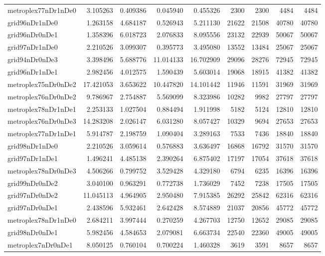 \begin{longtable}{|l|r|r|r|r|r|r|r|r|}
metroplex77nDr1nDe0 & 3.105263 & 0.409386 & 0.045940 & 0.455326 & 2300 & 2300 & 4484 & 4484 \\
grid96nDr1nDe0 & 1.263158 & 4.684187 & 0.526943 & 5.211130 & 21622 & 21508 & 40780 & 40780 \\
grid96nDr0nDe1 & 1.358396 & 6.018723 & 2.076833 & 8.095556 & 23132 & 22939 & 50067 & 50067 \\
grid97nDr1nDe0 & 2.210526 & 3.099307 & 0.395773 & 3.495080 & 13552 & 13484 & 25067 & 25067 \\
grid94nDr0nDe3 & 3.398496 & 5.688776 & 11.014133 & 16.702909 & 29096 & 28276 & 72945 & 72945 \\
grid96nDr1nDe1 & 2.982456 & 4.012575 & 1.590439 & 5.603014 & 19068 & 18915 & 41382 & 41382 \\
metroplex75nDr0nDe2 & 17.421053 & 3.653622 & 10.447820 & 14.101442 & 11946 & 11591 & 31969 & 31969 \\
metroplex76nDr0nDe2 & 9.786967 & 2.754887 & 5.569099 & 8.323986 & 10282 & 9982 & 27797 & 27797 \\
metroplex78nDr1nDe1 & 2.253133 & 1.027504 & 0.884494 & 1.911998 & 5182 & 5124 & 12810 & 12810 \\
metroplex76nDr0nDe3 & 14.283208 & 2.026147 & 6.031280 & 8.057427 & 10329 & 9694 & 27653 & 27653 \\
metroplex77nDr1nDe1 & 5.914787 & 2.198759 & 1.090404 & 3.289163 & 7533 & 7436 & 18840 & 18840 \\
grid98nDr1nDe0 & 2.210526 & 3.059614 & 0.576883 & 3.636497 & 16868 & 16792 & 31570 & 31570 \\
grid97nDr1nDe1 & 1.496241 & 4.485138 & 2.390264 & 6.875402 & 17197 & 17054 & 37618 & 37618 \\
metroplex78nDr0nDe3 & 4.506266 & 0.799752 & 3.529428 & 4.329180 & 6794 & 6235 & 16396 & 16396 \\
grid99nDr0nDe2 & 3.040100 & 0.963291 & 0.772738 & 1.736029 & 7452 & 7238 & 17505 & 17505 \\
grid97nDr0nDe2 & 11.045113 & 4.964905 & 2.950480 & 7.915385 & 26292 & 25842 & 62316 & 62316 \\
grid97nDr0nDe1 & 2.438596 & 5.932461 & 2.642428 & 8.574889 & 21037 & 20856 & 45772 & 45772 \\
metroplex78nDr1nDe0 & 2.684211 & 3.997444 & 0.270259 & 4.267703 & 12750 & 12652 & 29085 & 29085 \\
grid98nDr0nDe1 & 5.982456 & 4.584653 & 2.079081 & 6.663734 & 22540 & 22360 & 49005 & 49005 \\
metroplex7nDr0nDe1 & 8.050125 & 0.760104 & 0.700224 & 1.460328 & 3619 & 3591 & 8657 & 8657 \\

\end{longtable}
